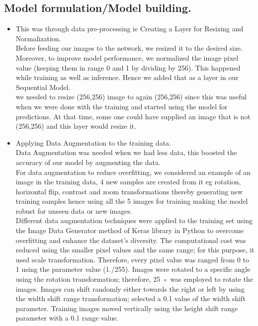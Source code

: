 \documentclass[11pt]{report}
\begin{document}
\subsection{Model formulation/Model building.}
\begin{itemize}
	\item This was through data pre-processing ie 
	Creating a Layer for Resizing and Normalization.\\
	
	Before feeding our images to the network, we resized it to the desired size. Moreover, to improve model performance, we normalized the image pixel value (keeping them in range 0 and 1 by dividing by 256). This happened while training as well as inference. Hence we added that as a layer in our Sequential Model.\\
	
	we needed to resize (256,256) image to again (256,256) since this was useful when we were done with the training and started using the model for predictions. At that time, some one could have supplied an image that is not (256,256) and this layer would resize it.\\
	
	\item Applying Data Augmentation to the training data.\\
	Data Augmentation was needed when we had less data, this boosted the accuracy of our model by augmenting the data.\\
	
	For data augmentation to reduce overfitting, we considered an example of an image in the training data, 4 new samples are created from it eg rotation, horizontal flip, contrast and zoom transformations thereby generating new training samples hence using all the 5 images for training making the model robust for unseen data or new images.\\
	
	Different data augmentation techniques were applied to the training set using the
	Image Data Generator method of Keras library in Python to overcome overfitting and
	enhance the dataset’s diversity. The computational cost was reduced using the smaller
	pixel values and the same range; for this purpose, it used scale transformation. Therefore,
	every pixel value was ranged from 0 to 1 using the parameter value (1./255). Images were
	rotated to a specific angle using the rotation transformation; therefore, 25 ◦ was employed
	to rotate the images. Images can shift randomly either towards the right or left by using the
	width shift range transformation; selected a 0.1 value of the width shift parameter. Training images moved vertically using the height shift range parameter with a 0.1 range value.\\
	

\end{itemize}
\end{document}
